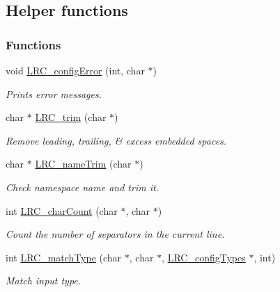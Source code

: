 \hypertarget{group___l_r_c__internals}{
\subsection{Helper functions}
\label{group___l_r_c__internals}
}
\subsubsection*{Functions}
\begin{CompactItemize}
\item 
void \hyperlink{group___l_r_c__internals_g0768167abe6a143840f26439a86ec79d}{LRC\_\-configError} (int, char $\ast$)
\begin{CompactList}\small\item\em Prints error messages. \item\end{CompactList}\item 
char $\ast$ \hyperlink{group___l_r_c__internals_g01c101649d6e132e1098711f84023ce7}{LRC\_\-trim} (char $\ast$)
\begin{CompactList}\small\item\em Remove leading, trailing, \& excess embedded spaces. \item\end{CompactList}\item 
char $\ast$ \hyperlink{group___l_r_c__internals_g713edeb31c0d15e409403be5a5f28ad8}{LRC\_\-nameTrim} (char $\ast$)
\begin{CompactList}\small\item\em Check namespace name and trim it. \item\end{CompactList}\item 
int \hyperlink{group___l_r_c__internals_gadc8707a894b997457d320923c940721}{LRC\_\-charCount} (char $\ast$, char $\ast$)
\begin{CompactList}\small\item\em Count the number of separators in the current line. \item\end{CompactList}\item 
int \hyperlink{group___l_r_c__internals_g4b2785b5ee9a3ab984c9dcfd3f9b3283}{LRC\_\-matchType} (char $\ast$, char $\ast$, \hyperlink{struct_l_r_c__config_types}{LRC\_\-configTypes} $\ast$, int)
\begin{CompactList}\small\item\em Match input type. \item\end{CompactList}\item 

\end{CompactItemize}
